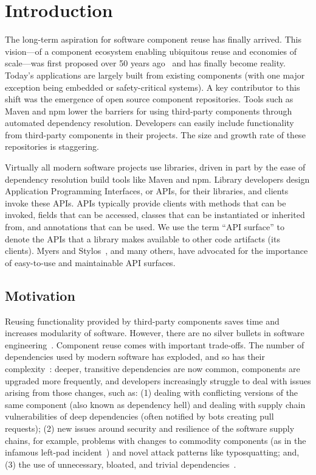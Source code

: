 \chapter{Introduction}
\label{sec:introduction}

The long-term aspiration for software component reuse has finally arrived. This vision---of a component ecosystem enabling ubiquitous reuse and economies of scale---was first proposed over 50 years ago~\cite{mcilroy1968mass} and has finally become reality. Today's applications are largely built from existing components (with one major exception being embedded or safety-critical systems). A key contributor to this shift was the emergence of open source component repositories. Tools such as Maven and npm lower the barriers for using third-party components through automated dependency resolution. Developers can easily include functionality from third-party components in their projects. The size and growth rate of these repositories is staggering. 

Virtually all modern software projects use libraries, driven in part by the ease of dependency resolution build tools like Maven and npm. Library developers design Application Programming Interfaces, or APIs, for their libraries, and clients invoke these APIs. APIs typically provide clients with methods that can be invoked, fields that can be accessed, classes that can be instantiated or inherited from, and annotations that can be used. We use the term ``API surface'' to denote the APIs that a library makes available to other code artifacts (its clients). Myers and Stylos~\cite{myers-cacm-2016}, and many others, have advocated for the importance of easy-to-use and maintainable API surfaces.


\section{Motivation}
\label{sec:motivation}

Reusing functionality provided by third-party components saves time and increases modularity of software. However, there are no silver bullets in software engineering~\cite{frederick87:_no_silver_bullet}. Component reuse comes with important trade-offs. The number of dependencies used by modern software has exploded, and so has their complexity~\cite{kikas2017structure,benelallam2019maven}: deeper, transitive dependencies are now common, components are upgraded more frequently, and developers increasingly struggle to deal with issues arising from those changes, such as: (1) dealing with conflicting versions of the same component (also known as dependency hell) and dealing with supply chain vulnerabilities of deep dependencies (often notified by bots creating pull requests); (2) new issues around security and resilience of the software supply chains, for example, problems with changes to commodity components (as in the infamous left-pad incident~\cite{collins16:_how}) and novel attack patterns like typosquatting; and, (3) the use of unnecessary, bloated, and trivial dependencies~\cite{abdalkareem2017developers,soto2021comprehensive}.

